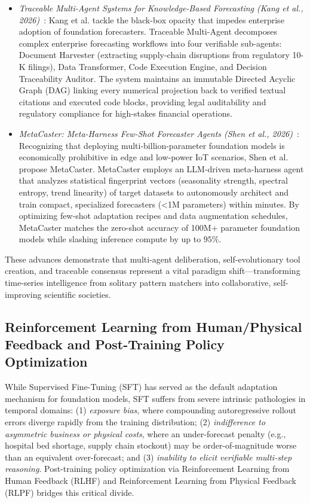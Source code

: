 \begin{itemize}[leftmargin=*]
    \item \emph{Traceable Multi-Agent Systems for Knowledge-Based Forecasting (Kang et al., 2026)}~\cite{kang2026traceable}: Kang et al. tackle the black-box opacity that impedes enterprise adoption of foundation forecasters. Traceable Multi-Agent decomposes complex enterprise forecasting workflows into four verifiable sub-agents: Document Harvester (extracting supply-chain disruptions from regulatory 10-K filings), Data Transformer, Code Execution Engine, and Decision Traceability Auditor. The system maintains an immutable Directed Acyclic Graph (DAG) linking every numerical projection back to verified textual citations and executed code blocks, providing legal auditability and regulatory compliance for high-stakes financial operations.
    \item \emph{MetaCaster: Meta-Harness Few-Shot Forecaster Agents (Shen et al., 2026)}~\cite{shen2026metacaster}: Recognizing that deploying multi-billion-parameter foundation models is economically prohibitive in edge and low-power IoT scenarios, Shen et al. propose MetaCaster. MetaCaster employs an LLM-driven meta-harness agent that analyzes statistical fingerprint vectors (seasonality strength, spectral entropy, trend linearity) of target datasets to autonomously architect and train compact, specialized forecasters (<1M parameters) within minutes. By optimizing few-shot adaptation recipes and data augmentation schedules, MetaCaster matches the zero-shot accuracy of 100M+ parameter foundation models while slashing inference compute by up to $95\%$.
\end{itemize}
These advances demonstrate that multi-agent deliberation, self-evolutionary tool creation, and traceable consensus represent a vital paradigm shift—transforming time-series intelligence from solitary pattern matchers into collaborative, self-improving scientific societies.

\subsection{Reinforcement Learning from Human/Physical Feedback and Post-Training Policy Optimization}
\label{sec:rlhf_policy_optimization}

While Supervised Fine-Tuning (SFT) has served as the default adaptation mechanism for foundation models, SFT suffers from severe intrinsic pathologies in temporal domains: (1) \emph{exposure bias}, where compounding autoregressive rollout errors diverge rapidly from the training distribution; (2) \emph{indifference to asymmetric business or physical costs}, where an under-forecast penalty (e.g., hospital bed shortage, supply chain stockout) may be order-of-magnitude worse than an equivalent over-forecast; and (3) \emph{inability to elicit verifiable multi-step reasoning}. Post-training policy optimization via Reinforcement Learning from Human Feedback (RLHF) and Reinforcement Learning from Physical Feedback (RLPF) bridges this critical divide.

